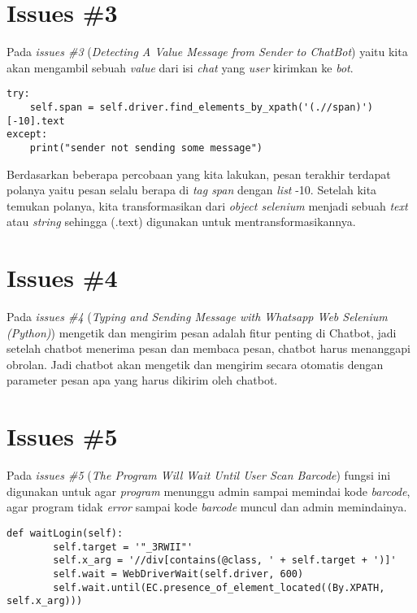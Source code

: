 \section{Issues \#3}
Pada \textit{issues \#3} (\textit{Detecting A Value Message from Sender to ChatBot}) yaitu kita akan mengambil sebuah \textit{value} dari isi \textit{chat} yang \textit{user} kirimkan ke \textit{bot}.
\begin{verbatim}
try:
    self.span = self.driver.find_elements_by_xpath('(.//span)')[-10].text
except:
    print("sender not sending some message")
\end{verbatim}
Berdasarkan beberapa percobaan yang kita lakukan, pesan terakhir terdapat polanya yaitu pesan selalu berapa di \textit{tag span} dengan \textit{list} -10. Setelah kita temukan polanya, kita transformasikan dari \textit{object selenium} menjadi sebuah \textit{text} atau \textit{string} sehingga (.text) digunakan untuk mentransformasikannya.

\section{Issues \#4}
Pada \textit{issues \#4} (\textit{Typing and Sending Message with Whatsapp Web Selenium (Python)}) mengetik dan mengirim pesan adalah fitur penting di Chatbot, jadi setelah chatbot menerima pesan dan membaca pesan, chatbot harus menanggapi obrolan. Jadi chatbot akan mengetik dan mengirim secara otomatis dengan parameter pesan apa yang harus dikirim oleh chatbot.

\section{Issues \#5}
Pada \textit{issues \#5} (\textit{The Program Will Wait Until User Scan Barcode}) fungsi ini digunakan untuk agar \textit{program} menunggu admin sampai memindai kode \textit{barcode}, agar program tidak \textit{error} sampai kode \textit{barcode} muncul dan admin memindainya.
\begin{verbatim}
def waitLogin(self):
        self.target = '"_3RWII"'
        self.x_arg = '//div[contains(@class, ' + self.target + ')]'
        self.wait = WebDriverWait(self.driver, 600)
        self.wait.until(EC.presence_of_element_located((By.XPATH, self.x_arg)))
\end{verbatim}

